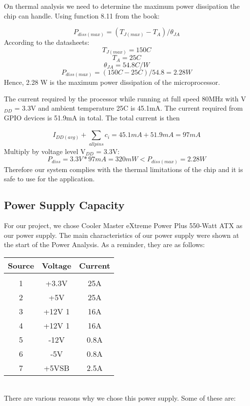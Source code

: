 		On thermal analysis we need to determine the maximum power dissipation the chip can handle. Using function 8.11 from the book:

				$$P_{diss(max)}=(T_{J(max)}-T_{A})/\theta_{JA}$$
		According to the datasheets:
				$$T_{J(max)} = 150 C$$
				$$T_{A} = 25 C$$
				$$\theta_{JA}=54.8 C/W$$
				$$P_{diss(max)}=(150C-25C) / 54.8 = 2.28 W $$
		Hence, 2.28 W is the maximum power dissipation of the microprocessor.

		The current required by the processor while running at full speed 80MHz with V$_{DD}$ = 3.3V and ambient temperature 25C is 45.1mA. The current required from GPIO devices is 51.9mA in total. The total current is then

			$$I_{DD(avg)} + \sum_{allpins}^{} c_i = 45.1mA + 51.9mA = 97 mA$$
		Multiply by voltage level V$_{DD}$ = 3.3V:
			$$P_{diss}= 3.3V * 97mA = 320 mW < P_{diss(max)}= 2.28 W $$
		Therefore our system complies with the thermal limitations of the chip and it is safe to use for the application.


	\subsection{Power Supply Capacity}

		For our project, we chose Cooler Master eXtreme Power Plus 550-Watt ATX as our power supply. The main characteristics of our power supply were shown at the start of the Power Analysis. As a reminder, they are as follows: 

		\begin{tabular}{|c|c|c|}
		\hline
		Source & Voltage & Current  \\
		\hline
		& & \\
		1 & +3.3V & 25A  \\
		2 & +5V & 25A  \\
		3 & +12V 1 & 16A  \\
		4 & +12V 1 & 16A  \\
		5 & -12V & 0.8A  \\
		6 & -5V & 0.8A  \\
		7 & +5VSB & 2.5A  \\
		\hline
		\end{tabular} \\

		There are various reasons why we chose this power supply. Some of these are: 

